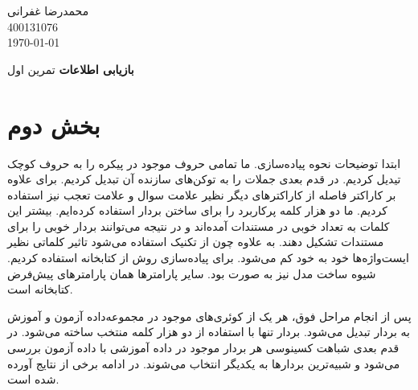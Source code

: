 \documentclass[12pt, a4paper]{book}
\newcommand{\coursetitle}{بازیابی اطلاعات}
\newcommand{\doctitle}{تمرین اول}
\newcommand{\name}{محمدرضا غفرانی}
\newcommand{\studentno}{400131076}
\newcommand{\todaydate}{\today}
\begin{document}
\begin{flushleft}
    \name \\
    \studentno \\
    \todaydate
\end{flushleft}

\begin{center}
    \huge
    \textbf{\coursetitle}
    \break
    \large
    \doctitle
\end{center}

\thispagestyle{plain}

\section*{بخش دوم}

ابتدا توضیحات نحوه‌ پیاده‌سازی. ما تمامی حروف موجود در پیکره را به حروف کوچک تیدیل کردیم. در قدم بعدی
جملات را به توکن‌های سازنده آن تبدیل کردیم. برای علاوه بر کاراکتر فاصله از کاراکتر‌های دیگر نظیر علامت سوال و
علامت تعجب نیز استفاده کردیم. ما دو هزار کلمه پرکاربرد را برای ساختن بردار  استفاده کرده‌ایم.
بیشتر این کلمات به تعداد خوبی در مستندات آمده‌اند و در نتیجه می‌توانند بردار خوبی را برای مستندات
تشکیل دهند. به علاوه چون از تکنیک  استفاده می‌شود تاثیر کلماتی نظیر ایست‌واژه‌ها
خود به خود کم می‌شود. برای پیاده‌سازی روش  از کتابخانه  استفاده کردیم. شیوه
ساخت مدل  نیز به صورت  بود. سایر پارامتر‌ها همان پارامتر‌های پیش‌فرض کتابخانه است.

پس از انجام مراحل فوق، هر یک از کوئری‌های موجود در مجموعه‌داده آزمون و آموزش به بردار  تبدیل
می‌شود. بردار  تنها با استفاده از دو هزار کلمه منتخب ساخته می‌شود. در قدم بعدی شباهت کسینوسی
هر بردار موجود در داده آموزشی با داده آزمون بررسی می‌شود و شبیه‌ترین بردار‌ها به یکدیگر انتخاب می‌شوند.
در ادامه برخی از نتایج آورده شده است.
\end{document}
